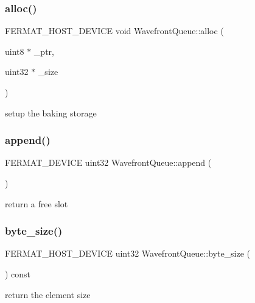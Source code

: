 \subsubsection{\texorpdfstring{alloc()}{alloc()}}
{\footnotesize\ttfamily F\+E\+R\+M\+A\+T\+\_\+\+H\+O\+S\+T\+\_\+\+D\+E\+V\+I\+CE void Wavefront\+Queue\+::alloc (\begin{DoxyParamCaption}\item[{uint8 $\ast$}]{\+\_\+ptr,  }\item[{uint32 $\ast$}]{\+\_\+size }\end{DoxyParamCaption})\hspace{0.3cm}{\ttfamily [inline]}}

setup the baking storage \mbox{\label{struct_wavefront_queue_af2c7120756267c5cd6bf51b0d98465fd}} 
\subsubsection{\texorpdfstring{append()}{append()}}
{\footnotesize\ttfamily F\+E\+R\+M\+A\+T\+\_\+\+D\+E\+V\+I\+CE uint32 Wavefront\+Queue\+::append (\begin{DoxyParamCaption}{ }\end{DoxyParamCaption})\hspace{0.3cm}{\ttfamily [inline]}}

return a free slot \mbox{\label{struct_wavefront_queue_a52f11e946e67999d653b56a8adb86b37}} 
\subsubsection{\texorpdfstring{byte\+\_\+size()}{byte\_size()}}
{\footnotesize\ttfamily F\+E\+R\+M\+A\+T\+\_\+\+H\+O\+S\+T\+\_\+\+D\+E\+V\+I\+CE uint32 Wavefront\+Queue\+::byte\+\_\+size (\begin{DoxyParamCaption}{ }\end{DoxyParamCaption}) const\hspace{0.3cm}{\ttfamily [inline]}}

return the element size \mbox{\label{struct_wavefront_queue_a3940005c37bd9db240f4adbcdfebd246}} 
